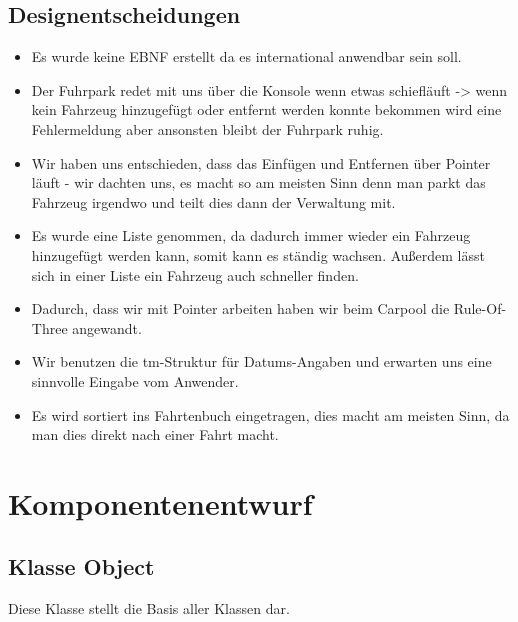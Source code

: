 \subsection{Designentscheidungen}
\begin{itemize}
\item Es wurde keine EBNF erstellt da es international anwendbar sein soll. 
\item Der Fuhrpark redet mit uns über die Konsole wenn etwas schiefläuft -> wenn kein Fahrzeug hinzugefügt oder entfernt werden konnte bekommen wird eine Fehlermeldung aber ansonsten bleibt der Fuhrpark ruhig. 
\item Wir haben uns entschieden, dass das Einfügen und Entfernen über Pointer läuft - wir dachten uns, es macht so am meisten Sinn denn man parkt das Fahrzeug irgendwo und teilt dies dann der Verwaltung mit. 
\item Es wurde eine Liste genommen, da dadurch immer wieder ein Fahrzeug hinzugefügt werden kann, somit kann es ständig wachsen. Außerdem lässt sich in einer Liste ein Fahrzeug auch schneller finden. 
\item Dadurch, dass wir mit Pointer arbeiten haben wir beim Carpool die Rule-Of-Three angewandt. 
\item Wir benutzen die tm-Struktur für Datums-Angaben und erwarten uns eine sinnvolle Eingabe vom Anwender. 
\item Es wird sortiert ins Fahrtenbuch eingetragen, dies macht am meisten Sinn, da man dies direkt nach einer Fahrt macht. 
\end{itemize}





\newpage
\section{Komponentenentwurf}

\subsection{Klasse Object}
Diese Klasse stellt die Basis aller Klassen dar.

